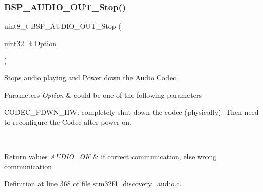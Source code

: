 \subsubsection{\texorpdfstring{B\+S\+P\+\_\+\+A\+U\+D\+I\+O\+\_\+\+O\+U\+T\+\_\+\+Stop()}{BSP\_AUDIO\_OUT\_Stop()}}
{\footnotesize\ttfamily uint8\+\_\+t B\+S\+P\+\_\+\+A\+U\+D\+I\+O\+\_\+\+O\+U\+T\+\_\+\+Stop (\begin{DoxyParamCaption}\item[{uint32\+\_\+t}]{Option }\end{DoxyParamCaption})}



Stops audio playing and Power down the Audio Codec. 


\begin{DoxyParams}{Parameters}
{\em Option} & could be one of the following parameters
\begin{DoxyItemize}
\item C\+O\+D\+E\+C\+\_\+\+P\+D\+W\+N\+\_\+\+HW\+: completely shut down the codec (physically). Then need to reconfigure the Codec after power on. ~\newline

\end{DoxyItemize}\\
\hline
\end{DoxyParams}

\begin{DoxyRetVals}{Return values}
{\em A\+U\+D\+I\+O\+\_\+\+OK} & if correct communication, else wrong communication \\
\hline
\end{DoxyRetVals}


Definition at line 368 of file stm32f4\+\_\+discovery\+\_\+audio.\+c.

